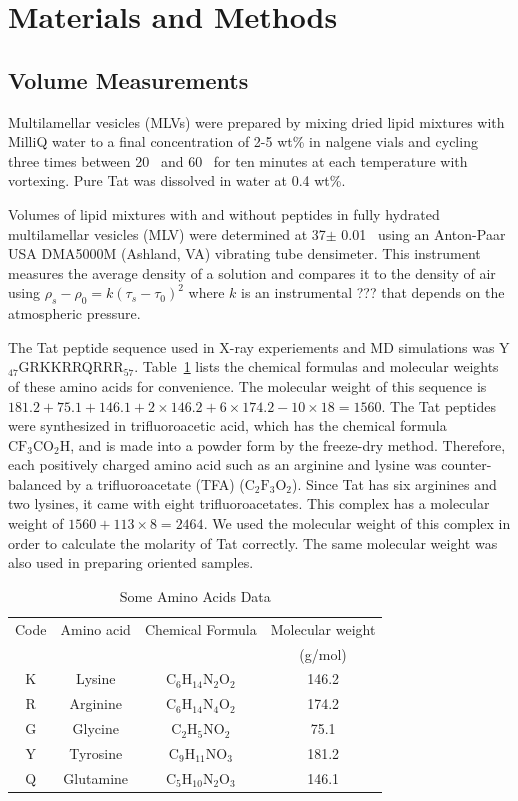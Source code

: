 \section{Materials and Methods}
\subsection{Volume Measurements}
Multilamellar vesicles (MLVs) were prepared by mixing dried lipid mixtures with 
MilliQ water to a final concentration of 2-5 wt\% in nalgene vials and cycling 
three times between 20 \textcelsius\ and 60 \textcelsius\ for ten minutes at 
each temperature with vortexing. Pure Tat was dissolved in water at 0.4 wt\%.

Volumes of lipid mixtures with and without peptides in fully hydrated 
multilamellar vesicles (MLV) were determined at 37$\pm$ 0.01 \textcelsius\ 
using an Anton-Paar USA DMA5000M (Ashland, VA) vibrating tube densimeter. 
This instrument measures the average density of a solution and compares it to
the density of air using $\rho_s-\rho_0=k(\tau_s-\tau_0)^2$ where $k$ is
an instrumental ??? that depends on the atmospheric pressure. 

The Tat peptide sequence used in X-ray experiements and MD simulations was 
Y$_{47}$GRKKRRQRRR$_{57}$. Table~\ref{tb:aa} lists the chemical formulas and 
molecular weights of these amino acids for convenience. The molecular weight of 
this sequence is 
$181.2+75.1+146.1+2 \times 146.2+6\times 174.2-10\times 18=1560$.
The Tat peptides were synthesized in trifluoroacetic acid, which has 
the chemical formula $\mathrm{CF_3CO_2H}$, and is made into a powder form by the 
freeze-dry method. Therefore, each positively charged amino acid such as 
an arginine and lysine was counter-balanced by a trifluoroacetate (TFA)
($\mathrm{C_2F_3O_2}$). Since Tat has six arginines and two lysines, it came 
with eight trifluoroacetates. This complex has a molecular weight of 
$1560+113\times 8=2464$. We used the 
molecular weight of this complex in order to calculate the molarity of Tat
correctly. The same molecular weight was also used in preparing oriented 
samples.

\begin{table}[htbp]
  \centering
  \begin{tabular}{c c c c}
    \hline
    Code & Amino acid & Chemical Formula & Molecular weight \\
    & & & (g/mol) \\
    \hline
    K & Lysine & $\mathrm{C_6H_{14}N_2O_2}$ & 146.2 \\
    R & Arginine & $\mathrm{C_6H_{14}N_4O_2}$ & 174.2 \\
    G & Glycine & $\mathrm{C_2H_5NO_2}$ & 75.1\\
    Y & Tyrosine & $\mathrm{C_9H_{11}NO_3}$ & 181.2 \\
    Q & Glutamine & $\mathrm{C_5H_{10}N_2O_3}$ & 146.1 \\ 
    \hline
  \end{tabular}
  \caption{Some Amino Acids Data}
  \label{tb:aa}
\end{table}

